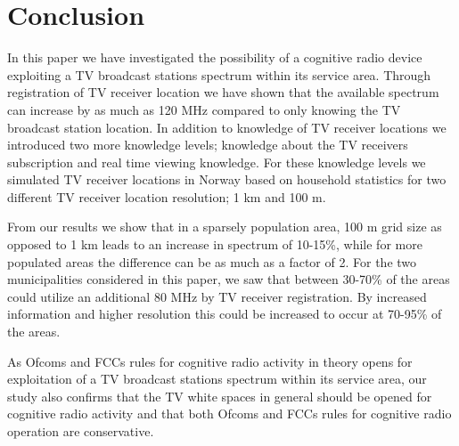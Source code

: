 \documentclass[journal,11pt,draftclsnofoot,onecolumn]{IEEEtran}
\begin{document}
\section{Conclusion}
\label{sec:conclusion}
In this paper we have investigated the possibility of a cognitive radio device exploiting a TV broadcast stations spectrum within its service area. Through registration of TV receiver location we have shown that the available spectrum can increase by as much as 120 MHz compared to only knowing the TV broadcast station location. In addition to knowledge of TV receiver locations we introduced two more knowledge levels; knowledge about the TV receivers subscription and real time viewing knowledge. For these knowledge levels we simulated TV receiver locations in Norway based on household statistics for two different TV receiver location resolution; 1 km and 100 m.

From our results we show that in a sparsely population area, 100 m grid size as opposed to 1 km leads to an increase in spectrum of 10-15\%, while for more populated areas the difference can be as much as a factor of 2. For the two municipalities considered in this paper, we saw that between 30-70\% of the areas could utilize an additional 80 MHz by TV receiver registration. By increased information and higher resolution this could be increased to occur at 70-95\% of the areas.

As Ofcoms and FCCs rules for cognitive radio activity in theory opens for exploitation of a TV broadcast stations spectrum within its service area, our study also confirms that the TV white spaces in general should be opened for cognitive radio activity and that both Ofcoms and FCCs rules for cognitive radio operation are conservative.
\end{document}
